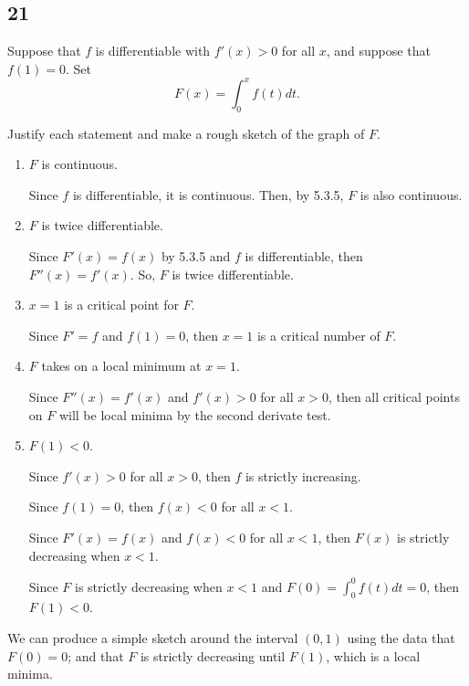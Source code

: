 \documentclass[../hw5.tex]{subfiles}
\begin{document}
\subsection*{21}
Suppose that $f$ is differentiable with $f'(x) > 0$ for all $x$, and suppose that $f(1) = 0$. 
Set \[F(x) = \int_{0}^{x} f(t)dt.\]

Justify each statement and make a rough sketch of the graph of $F$.

\begin{enumerate}[label= (\alph*)]
    \item $F$ is continuous.
    
    Since $f$ is differentiable, it is continuous. Then, by 5.3.5, $F$ is also continuous.

    \item $F$ is twice differentiable.
    
    Since $F'(x)=f(x)$ by 5.3.5 and $f$ is differentiable, then $F''(x)=f'(x)$. So, $F$ is twice differentiable.

    \item $x = 1$ is a critical point for $F$.
    
    Since $F'=f$ and $f(1)=0$, then $x=1$ is a critical number of $F$. 

    \item $F$ takes on a local minimum at $x = 1$.

    Since $F''(x)=f'(x)$ and $f'(x)>0$ for all $x>0$, then all critical points on $F$ will be local minima by the second derivate test.

    \item $F(1) < 0$.

    Since $f'(x)>0$ for all $x>0$, then $f$ is strictly increasing.


    Since $f(1)=0$, then $f(x)<0$ for all $x<1$.

    Since $F'(x)=f(x)$ and $f(x)<0$ for all $x<1$, then $F(x)$ is strictly decreasing when $x<1$.

    Since $F$ is strictly decreasing when $x<1$ and $F(0)=\int_{0}^{0} f(t)dt=0$, then $F(1)<0$.


\end{enumerate}

We can produce a simple sketch around the interval $(0,1)$ using the data that $F(0)=0$; and that $F$ is strictly decreasing until $F(1)$, which is a local minima.
\end{document}
